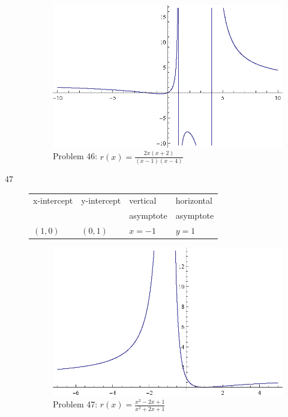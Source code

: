 \documentclass{exam}
\begin{document}
\begin{description}
      \begin{figure}[H]
        \centering
        \includegraphics[scale = 0.8]{problem46.eps}
        \caption*{ Problem 46: $r(x) = \frac{2x(x + 2)}{(x - 1)(x - 4)}$ }
      \end{figure}

    \item[47]
      \begin{tabular}{llll}
        \toprule
        x-intercept & y-intercept & vertical  & horizontal \\
                    &             & asymptote & asymptote \\
        \midrule
        $(1, 0)$    & $(0, 1)$    & $x = -1$  & $y = 1$ \\
        \bottomrule
      \end{tabular}

      \begin{figure}[H]
        \centering
        \includegraphics[scale = 0.8]{problem47.eps}
        \caption*{ Problem 47: $r(x) = \frac{x^2 - 2x + 1}{x^2 + 2x + 1}$ }
      \end{figure}


\end{description}
\end{document}
